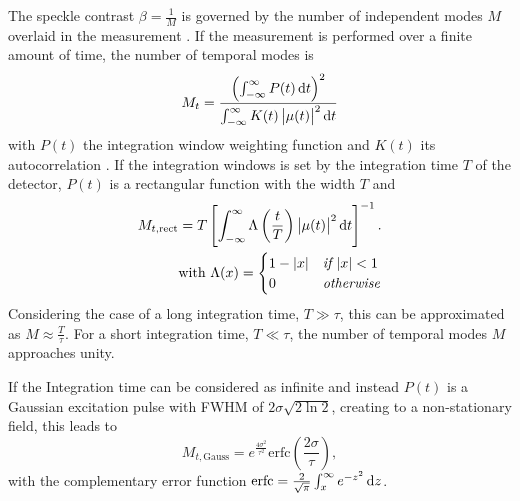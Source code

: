 The speckle contrast $\beta =\tfrac{1}{M}$ is governed by the number of independent modes $M$ overlaid in the measurement \cite{goodman2000}. 
If the measurement is performed over a finite amount of time, the number of temporal modes is
\begin{equation}
M_t=\frac{\left(\int_{-\infty}^{\infty} P(t)\operatorname{\mathrm{d}\!} t\right)^2}{\int_{-\infty}^{\infty} K(t) \left|\mu(t)\right|^2\operatorname{\mathrm{d}\!} t}
\label{eq:modes}
\end{equation}
with $P(t)$ the integration window weighting function and $K(t)$ its autocorrelation \cite{goodman2007}. If the integration windows is set by the integration time $T$ of the detector, $P(t)$ is a rectangular function with the width $T$ and
\begin{align}
M_{t,\text{rect}} =T \left[\int_{-\infty}^{\infty} \Lambda\left(\frac{t}{T}\right) \left|\mu(t)\right|^2 \operatorname{\mathrm{d}\!} t \right]^{-1} .\\
\text{with  }\Lambda(x) = \begin{cases} 
 1-\left|x\right|& \textit{if }|x|<1\\
0 & \textit{otherwise}\\ 
\end{cases}
\label{eq:modesapprox}
\end{align}
Considering the case of a long integration time, $T\gg\tau$, this can be approximated as $M\approx\frac{T}{\tau}$. For a short integration time,  $T\ll\tau$, the number of temporal modes $M$ approaches unity.

If the Integration time can be considered as infinite and instead $P(t)$ is a Gaussian excitation pulse with FWHM of $2\sigma\sqrt{2\ln2}$, creating to a non-stationary field, this leads to
\begin{equation}
	M_{t,\text{Gauss}}=e^{\frac{4 \sigma ^2}{\tau ^2}} \text{erfc}\left(\frac{2 \sigma }{\tau }\right),
	\label{eq:mgauss}
\end{equation}
with the complementary error function $\operatorname{erfc}=\frac{2}{\sqrt{\pi}}\int_x^\infty e^{-z^2}\operatorname{\mathrm{d}\!} z$.

